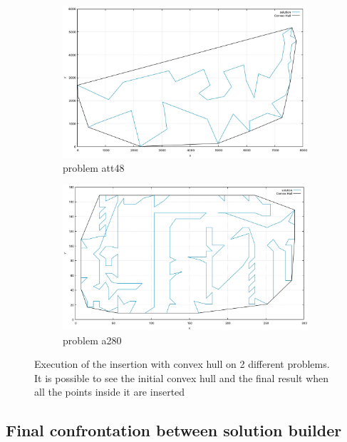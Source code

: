 \begin{figure}[h!]
  \centering
  \begin{subfigure}[b]{0.8\linewidth}
    \includegraphics[width=\linewidth]{media/convex1.jpg}
     \caption{problem att48}
  \end{subfigure}
  \begin{subfigure}[b]{0.8\linewidth}
    \includegraphics[width=\linewidth]{media/convex2.jpg}
    \caption{problem a280}
  \end{subfigure}
  \caption{Execution of the insertion with convex hull on 2 different problems. It is possible to see the initial convex hull and the final result when all the points inside it are inserted}
\end{figure}

\subsection{Final confrontation between solution builder}

